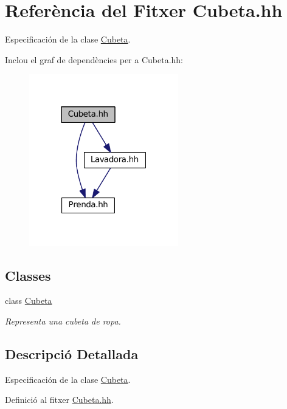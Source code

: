 \hypertarget{_cubeta_8hh}{\section{Referència del Fitxer Cubeta.\+hh}
\label{_cubeta_8hh}
}


Especificación de la clase \hyperlink{class_cubeta}{Cubeta}.  


Inclou el graf de dependències per a Cubeta.\+hh\+:
\nopagebreak
\begin{figure}[H]
\begin{center}
\leavevmode
\includegraphics[width=184pt]{_cubeta_8hh__incl}
\end{center}
\end{figure}
\subsection*{Classes}
\begin{DoxyCompactItemize}
\item 
class \hyperlink{class_cubeta}{Cubeta}
\begin{DoxyCompactList}\small\item\em Representa una cubeta de ropa. \end{DoxyCompactList}\end{DoxyCompactItemize}


\subsection{Descripció Detallada}
Especificación de la clase \hyperlink{class_cubeta}{Cubeta}. 



Definició al fitxer \hyperlink{_cubeta_8hh_source}{Cubeta.\+hh}.

